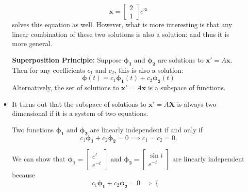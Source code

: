 \begin{itemize}
\begin{example}
              \begin{equation}
                  \bm{x} = \begin{bmatrix}
                      2 \\ 1
                  \end{bmatrix}e^{3t}
              \end{equation}
              solves this equation as well. However, what is more interesting is that any linear combination of these two solutions is also a solution: and thus it is more general.
          \end{example}
          \begin{theorem}
              \textbf{Superposition Principle:} Suppose $\bm{\phi_1}$ and $\bm{\phi_2}$ are solutions to $\bm{x}'=A\bm{x}$. Then for any coefficients $c_1$ and $c_2$, this is also a solution:
              \begin{equation}
                  \bm{\phi}(t) = c_1\bm{\phi_1}(t) + c_2\bm{\phi_2}(t)
              \end{equation}
              Alternatively, the set of solutions to $\bm{x}'=A\bm{x}$ is a subspace of functions.
          \end{theorem}
    \item It turns out that the subspace of solutions to $\bm{x}'=A\bm{X}$ is always two-dimensional if it is a system of two equations.
          \begin{definition}
              Two functions $\bm{\phi_1}$ and $\bm{\phi_2}$ are linearly independent if and only if
              \begin{equation}
                  c_1\bm{\phi_1}+c_2\bm{\phi_2} = 0 \implies c_1=c_2 = 0.
              \end{equation}
          \end{definition}
          \begin{example}
              We can show that $\bm{\phi_1}=\begin{bmatrix}
                      e^t \\ e^{-t}
                  \end{bmatrix}$ and $\bm{\phi_2} = \begin{bmatrix}
                      \sin t \\ e^{-t}
                  \end{bmatrix}$ are linearly independent because
              \begin{equation}
                  c_1\bm{\phi_1}+c_2\bm{\phi_2} = 0 \implies \begin{cases}

\end{cases}
\end{equation}
\end{example}
\end{itemize}

